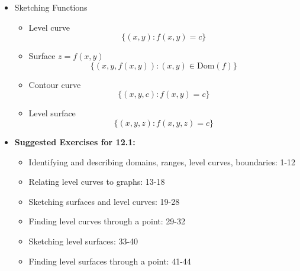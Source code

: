 \documentclass[12pt]{article}
\renewcommand{\vec}[1]{\mathbf{#1}}
\newcommand{\<}{\left<}
\renewcommand{\>}{\right>}
\begin{document}
\begin{itemize}
    \item Sketching Functions
  
      \begin{itemize}
        \item Level curve
          \[\{(x,y):f(x,y)=c\}\]
        \item Surface $z=f(x,y)$
          \[\{(x,y,f(x,y)): (x,y)\in \textrm{Dom}(f)\}\]
        \item Contour curve 
          \[\{(x,y,c): f(x,y)=c\}\]
        \item Level surface
          \[\{(x,y,z):f(x,y,z)=c\}\]
      \end{itemize}
  
  \item \textbf{ Suggested Exercises for 12.1:}
  
    \begin{itemize}
    \item Identifying and describing domains, ranges, level curves, boundaries: 1-12
    \item Relating level curves to graphs: 13-18
    \item Sketching surfaces and level curves: 19-28
    \item Finding level curves through a point: 29-32
    \item Sketching level surfaces: 33-40
    \item Finding level surfaces through a point: 41-44
    \end{itemize}
    
  \end{itemize}
  
  
  
  
  
    
\end{document}
